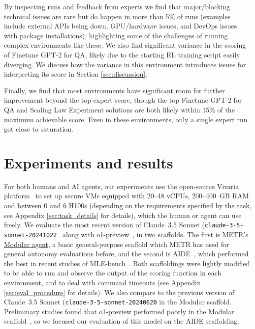 \documentclass{article}
\begin{document}
By inspecting runs and feedback from experts we find that major/blocking technical issues are rare but do happen in more than 5\% of runs (examples include external APIs being down, GPU/hardware issues, and DevOps issues with package installations), highlighting some of the challenges of running complex environments like these. We also find significant variance in the scoring of Finetune GPT-2 for QA, likely due to the starting RL training script easily diverging. We discuss how the variance in this environment introduces issues for interpreting its score in Section \ref{sec:discussion}.

Finally, we find that most environments have significant room for further improvement beyond the top expert score, though the top Finetune GPT-2 for QA and Scaling Law Experiment solutions are both likely within 15\% of the maximum achievable score. Even in these environments, only a single expert run got close to saturation. 

\section{Experiments and results}
\label{sec:results}

For both humans and AI agents, our experiments use the open-source Vivaria platform~\cite{vivaria2024} to set up secure VMs equipped with 20--48 vCPUs, 200--400~GB RAM and between 0 and 6 H100s (depending on the requirements specified by the task, see Appendix \ref{sec:task_details} for details), which the human or agent can use freely. We evaluate the most recent version of Claude~3.5 Sonnet (\texttt{claude-3-5-sonnet-20241022}~\cite{anthropic2024claude35sonnet} along with o1-preview~\cite{openai2024o1}, in two scaffolds. The first is METR's \href{https://github.com/poking-agents/modular-public}{Modular agent}, a basic general-purpose scaffold which METR has used for general autonomy evaluations before, and the second is AIDE~\cite{weco2024aide}, which performed the best in recent studies of MLE-bench~\cite{chan2024mlebenchevaluatingmachinelearning}. Both scaffoldings were lightly modified to be able to run and observe the output of the scoring function in each environment, and to deal with command timeouts (see Appendix \ref{sec:eval_procedure} for details). We also compare to the previous version of Claude~3.5 Sonnet (\texttt{claude-3-5-sonnet-20240620} in the Modular scaffold. Preliminary studies found that o1-preview performed poorly in the Modular scaffold~\cite{METR2024o1preview}, so we focused our evaluation of this model on the AIDE scaffolding. 
\end{document}
